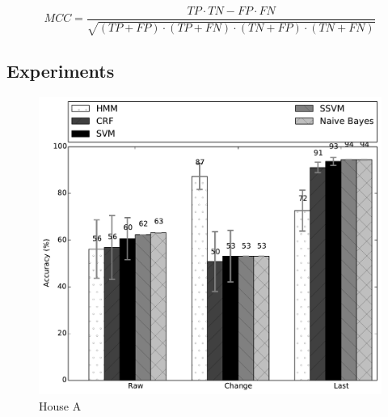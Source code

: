 \documentclass[11pt, oneside]{article}   	%
\begin{document}
\begin{equation}
MCC=\frac{TP\cdot TN-FP\cdot FN}{\sqrt{(TP+FP)\cdot (TP+FN)\cdot (TN+FP)\cdot (TN+FN)}}
\end{equation}


\subsection{Experiments}
\begin{figure}[t!]
\begin{center}
\includegraphics[width=5in]{../../src/reports/A.pdf}
\end{center}
\vspace{-0.5cm}
\caption{House A}
\label{fig:house_a}
\vspace{-0.5cm}
\end{figure}
\end{document}
